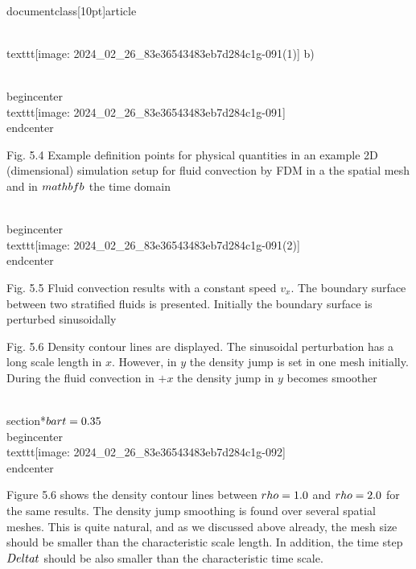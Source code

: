 \\documentclass[10pt]{article}
\begin{document}
{\\texttt{[image: 2024\_02\_26\_83e36543483eb7d284c1g-091(1)]}
b)

\\begin{center}
\\texttt{[image: 2024\_02\_26\_83e36543483eb7d284c1g-091]}
\\end{center}

Fig. 5.4 Example definition points for physical quantities in an example 2D (dimensional) simulation setup for fluid convection by FDM in a the spatial mesh and in $\\mathbf{b}$ the time domain

\\begin{center}
\\texttt{[image: 2024\_02\_26\_83e36543483eb7d284c1g-091(2)]}
\\end{center}

Fig. 5.5 Fluid convection results with a constant speed $v_{x}$. The boundary surface between two stratified fluids is presented. Initially the boundary surface is perturbed sinusoidally

Fig. 5.6 Density contour lines are displayed. The sinusoidal perturbation has a long scale length in $x$. However, in $y$ the density jump is set in one mesh initially. During the fluid convection in $+x$ the density jump in $y$ becomes smoother

\\section*{$\\bar{t}=0.35$}
\\begin{center}
\\texttt{[image: 2024\_02\_26\_83e36543483eb7d284c1g-092]}
\\end{center}

Figure 5.6 shows the density contour lines between $\\rho=1.0$ and $\\rho=2.0$ for the same results. The density jump smoothing is found over several spatial meshes. This is quite natural, and as we discussed above already, the mesh size should be smaller than the characteristic scale length. In addition, the time step $\\Delta t$ should be also smaller than the characteristic time scale.

}
\end{document}
